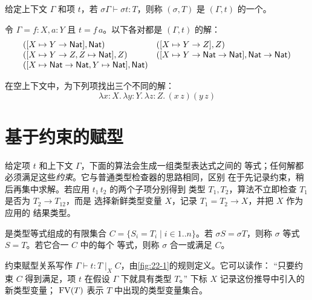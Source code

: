 \begin{definition}
\label{def:22.2.1}
给定上下文 \(\Gamma\) 和项 \(t\)，若
\(\sigma\Gamma\vdash\sigma t:T\)，则称 \((\sigma,T)\) 是
\((\Gamma,t)\) 的一个。
\end{definition}

\begin{example}
\label{exm:22.2.2}
令 \(\Gamma=f:X,a:Y\) 且 \(t=f\,a\)。以下各对都是
\((\Gamma,t)\) 的解：
\[
\begin{array}{ll}
([X\mapsto Y\to\mathsf{Nat}],\mathsf{Nat})
&([X\mapsto Y\to Z],Z)\\
([X\mapsto Y\to Z,Z\mapsto\mathsf{Nat}],Z)
&([X\mapsto Y\to\mathsf{Nat}\to\mathsf{Nat}],
  \mathsf{Nat}\to\mathsf{Nat})\\
([X\mapsto\mathsf{Nat}\to\mathsf{Nat},
  Y\mapsto\mathsf{Nat}],\mathsf{Nat})
\end{array}
\]
\end{example}

\begin{exercise}[\(\star\), \(\nrightarrow\)]
\label{ex:22.2.3}
在空上下文中，为下列项找出三个不同的解：
\[
\lambda x:X.\,\lambda y:Y.\,\lambda z:Z.\,(x\,z)(y\,z)
\]
\end{exercise}

\section{基于约束的赋型}
\label{sec:22.3}

给定项 \(t\) 和上下文 \(\Gamma\)，下面的算法会生成一组类型表达式之间的
等式；任何解都必须满足这些\emph{约束}。它与普通类型检查器的思路相同，区别
在于先记录约束，稍后再集中求解。若应用 \(t_1\,t_2\) 的两个子项分别得到
类型 \(T_1,T_2\)，算法不立即检查 \(T_1\) 是否为 \(T_2\to T_{12}\)，而是
选择新鲜类型变量 \(X\)，记录 \(T_1=T_2\to X\)，并把 \(X\) 作为应用的
结果类型。

\begin{definition}
\label{def:22.3.1}
是类型等式组成的有限集合
\(C=\{S_i=T_i\mid i\in1..n\}\)。若 \(\sigma S=\sigma T\)，则称
\(\sigma\) 等式 \(S=T\)。若它合一 \(C\) 中的每个
等式，则称 \(\sigma\) 合一或满足 \(C\)。
\end{definition}

\begin{definition}
\label{def:22.3.2}
约束赋型关系写作
\(\Gamma\vdash t:T\mid_X C\)，由\cref{fig:22-1}的规则定义。它可以读作：
“只要约束 \(C\) 得到满足，项 \(t\) 在假设 \(\Gamma\) 下就具有类型 \(T\)。”
下标 \(X\) 记录这份推导中引入的新类型变量；
\(\operatorname{FV}(T)\) 表示 \(T\) 中出现的类型变量集合。
\end{definition}

